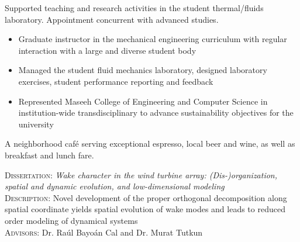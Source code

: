 \documentclass[10pt,ragged2e,a4paper,academicons]{altacv}
\begin{document}
Supported teaching and research activities in the student thermal/fluids laboratory. Appointment concurrent with advanced studies.
\begin{itemize}
\item Graduate instructor in the mechanical engineering curriculum with regular interaction with a large and diverse student body
\item Managed the student fluid mechanics laboratory, designed laboratory exercises, student performance reporting and feedback
\item Represented Maseeh College of Engineering and Computer Science in institution-wide transdisciplinary to advance sustainability objectives for the university
\end{itemize}

\divider

\newpage
{}
A neighborhood caf\'e serving exceptional espresso, local beer and wine, as well as breakfast and lunch fare.



\textsc{Dissertation:} \emph{Wake character in the wind turbine array: (Dis-)organization, spatial and dynamic evolution, and low-dimensional modeling}\\
\textsc{Description:} Novel development of the proper orthogonal decomposition along spatial coordinate yields spatial evolution of wake modes and leads to reduced order modeling of dynamical systems\\
\textsc{Advisors:} Dr. Ra\'ul Bayo\'an Cal and Dr. Murat Tutkun
\end{document}
